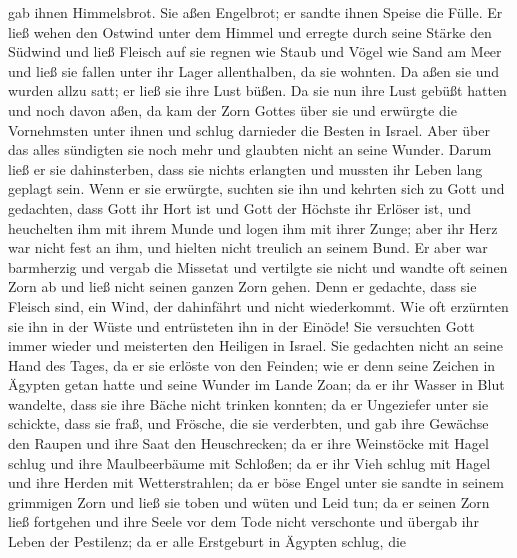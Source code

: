 gab ihnen Himmelsbrot.  Sie aßen Engelbrot; er sandte
ihnen Speise die Fülle.  Er ließ wehen den Ostwind unter
dem Himmel und erregte durch seine Stärke den Südwind 
und ließ Fleisch auf sie regnen wie Staub und Vögel wie Sand am Meer
 und ließ sie fallen unter ihr Lager allenthalben, da sie
wohnten.  Da aßen sie und wurden allzu satt; er ließ sie
ihre Lust büßen.  Da sie nun ihre Lust gebüßt hatten und
noch davon aßen,  da kam der Zorn Gottes über sie und
erwürgte die Vornehmsten unter ihnen und schlug darnieder die Besten in
Israel.  Aber über das alles sündigten sie noch mehr und
glaubten nicht an seine Wunder.  Darum ließ er sie
dahinsterben, dass sie nichts erlangten und mussten ihr Leben lang
geplagt sein.  Wenn er sie erwürgte, suchten sie ihn und
kehrten sich zu Gott  und gedachten, dass Gott ihr Hort
ist und Gott der Höchste ihr Erlöser ist,  und heuchelten
ihm mit ihrem Munde und logen ihm mit ihrer Zunge;  aber
ihr Herz war nicht fest an ihm, und hielten nicht treulich an seinem
Bund.  Er aber war barmherzig und vergab die Missetat und
vertilgte sie nicht und wandte oft seinen Zorn ab und ließ nicht seinen
ganzen Zorn gehen.  Denn er gedachte, dass sie Fleisch
sind, ein Wind, der dahinfährt und nicht wiederkommt. 
Wie oft erzürnten sie ihn in der Wüste und entrüsteten ihn in der
Einöde!  Sie versuchten Gott immer wieder und meisterten
den Heiligen in Israel.  Sie gedachten nicht an seine
Hand des Tages, da er sie erlöste von den Feinden;  wie
er denn seine Zeichen in Ägypten getan hatte und seine Wunder im Lande
Zoan;  da er ihr Wasser in Blut wandelte, dass sie ihre
Bäche nicht trinken konnten;  da er Ungeziefer unter sie
schickte, dass sie fraß, und Frösche, die sie verderbten,
 und gab ihre Gewächse den Raupen und ihre Saat den
Heuschrecken;  da er ihre Weinstöcke mit Hagel schlug und
ihre Maulbeerbäume mit Schloßen;  da er ihr Vieh schlug
mit Hagel und ihre Herden mit Wetterstrahlen;  da er böse
Engel unter sie sandte in seinem grimmigen Zorn und ließ sie toben und
wüten und Leid tun;  da er seinen Zorn ließ fortgehen und
ihre Seele vor dem Tode nicht verschonte und übergab ihr Leben der
Pestilenz;  da er alle Erstgeburt in Ägypten schlug, die
